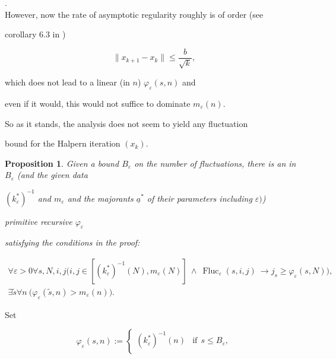 \documentclass[1p]{elsarticle}
\DeclareMathOperator{\Fluc}{Fluc}
\newcommand{\Tif}{\text{if}\ }
\theoremstyle{plain}
\newtheorem{prop}[thm]{Proposition}
\theoremstyle{definition}
\theoremstyle{remark}
\renewenvironment{proof}[1][]{\noindent{\bf Proof{#1}. }}{\nopagebreak[4]{\hspace*{\fill}


  $\Box$              %

 }{\vspace{2ex}}}
\renewcommand{\phi}{\varphi}
\renewcommand{\epsilon}{\varepsilon}
\theoremstyle{definition}
\begin{document}
{\cite{Xu}.\\

However, now the rate of asymptotic regularity roughly is of order (see 

corollary 6.3 in \cite{Kohlenbach/Leustean6}) 

\[ \| x_{k+1}-x_k\| \le \frac{b}{\sqrt{k}}, \] 

which does not lead to a linear (in $n$) $\varphi_{\varepsilon}(s,n)$ and 

even if it would, this would not suffice to dominate $m_{\varepsilon}(n).$ 

So as it stands, the analysis does not seem to yield any fluctuation 

bound for the Halpern iteration $(x_k).$



\begin{prop}

Given a bound $B_{\varepsilon}$ on the number of fluctuations, there is an in $B_{\varepsilon}$ (and the given data 

$(k^*_{\varepsilon})^{-1}$ and $m_{\varepsilon}$ and the majorants $\underline{a}^*$ of their parameters including $\varepsilon)$) 

primitive recursive $\phi_\epsilon$

satisfying the conditions in the proof:

\begin{align}

\forall \varepsilon >0 \forall s,N,i,j \big( i,j\in[(k^*_\epsilon)^{-1}(N),

m_\epsilon(N)]\ \wedge\ \Fluc_{\varepsilon}(s,i,j)\ 

\rightarrow j_s\geq \phi_\epsilon(s,N) \big),\label{e:FU1}\\

\exists \tilde s\forall n\ \big(\phi_\epsilon(\tilde s,n)>m_\epsilon(n)\big).\label{e:FU2}

\end{align}

\end{prop}

\begin{proof}

Set

\[

\phi_\epsilon(s,n):=\begin{cases}

(k^*_\epsilon)^{-1}(n)&\Tif\ s\leq B_{\varepsilon},\\


\end{cases}\]
\end{proof}}
\end{document}
